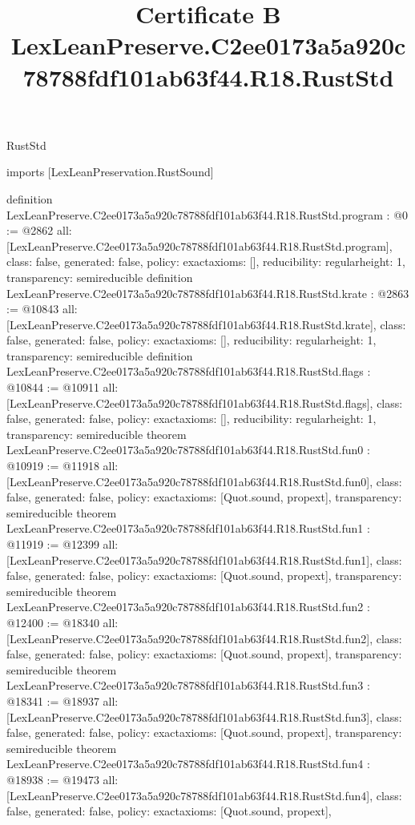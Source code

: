 \begin{lexlean}{RustStd}
\title{Certificate B LexLeanPreserve.C2ee0173a5a920c78788fdf101ab63f44.R18.RustStd}
\begin{coremodule}
imports [LexLeanPreservation.RustSound]

definition LexLeanPreserve.C2ee0173a5a920c78788fdf101ab63f44.R18.RustStd.program : @0 := @2862 {
  all: [LexLeanPreserve.C2ee0173a5a920c78788fdf101ab63f44.R18.RustStd.program],
  class: false,
  generated: false,
  policy: exact{axioms: []},
  reducibility: regular{height: 1},
  transparency: semireducible
}
definition LexLeanPreserve.C2ee0173a5a920c78788fdf101ab63f44.R18.RustStd.krate : @2863 := @10843 {
  all: [LexLeanPreserve.C2ee0173a5a920c78788fdf101ab63f44.R18.RustStd.krate],
  class: false,
  generated: false,
  policy: exact{axioms: []},
  reducibility: regular{height: 1},
  transparency: semireducible
}
definition LexLeanPreserve.C2ee0173a5a920c78788fdf101ab63f44.R18.RustStd.flags : @10844 := @10911 {
  all: [LexLeanPreserve.C2ee0173a5a920c78788fdf101ab63f44.R18.RustStd.flags],
  class: false,
  generated: false,
  policy: exact{axioms: []},
  reducibility: regular{height: 1},
  transparency: semireducible
}
theorem LexLeanPreserve.C2ee0173a5a920c78788fdf101ab63f44.R18.RustStd.fun0 : @10919 := @11918 {
  all: [LexLeanPreserve.C2ee0173a5a920c78788fdf101ab63f44.R18.RustStd.fun0],
  class: false,
  generated: false,
  policy: exact{axioms: [Quot.sound, propext]},
  transparency: semireducible
}
theorem LexLeanPreserve.C2ee0173a5a920c78788fdf101ab63f44.R18.RustStd.fun1 : @11919 := @12399 {
  all: [LexLeanPreserve.C2ee0173a5a920c78788fdf101ab63f44.R18.RustStd.fun1],
  class: false,
  generated: false,
  policy: exact{axioms: [Quot.sound, propext]},
  transparency: semireducible
}
theorem LexLeanPreserve.C2ee0173a5a920c78788fdf101ab63f44.R18.RustStd.fun2 : @12400 := @18340 {
  all: [LexLeanPreserve.C2ee0173a5a920c78788fdf101ab63f44.R18.RustStd.fun2],
  class: false,
  generated: false,
  policy: exact{axioms: [Quot.sound, propext]},
  transparency: semireducible
}
theorem LexLeanPreserve.C2ee0173a5a920c78788fdf101ab63f44.R18.RustStd.fun3 : @18341 := @18937 {
  all: [LexLeanPreserve.C2ee0173a5a920c78788fdf101ab63f44.R18.RustStd.fun3],
  class: false,
  generated: false,
  policy: exact{axioms: [Quot.sound, propext]},
  transparency: semireducible
}
theorem LexLeanPreserve.C2ee0173a5a920c78788fdf101ab63f44.R18.RustStd.fun4 : @18938 := @19473 {
  all: [LexLeanPreserve.C2ee0173a5a920c78788fdf101ab63f44.R18.RustStd.fun4],
  class: false,
  generated: false,
  policy: exact{axioms: [Quot.sound, propext]},
}
\end{coremodule}
\end{lexlean}
